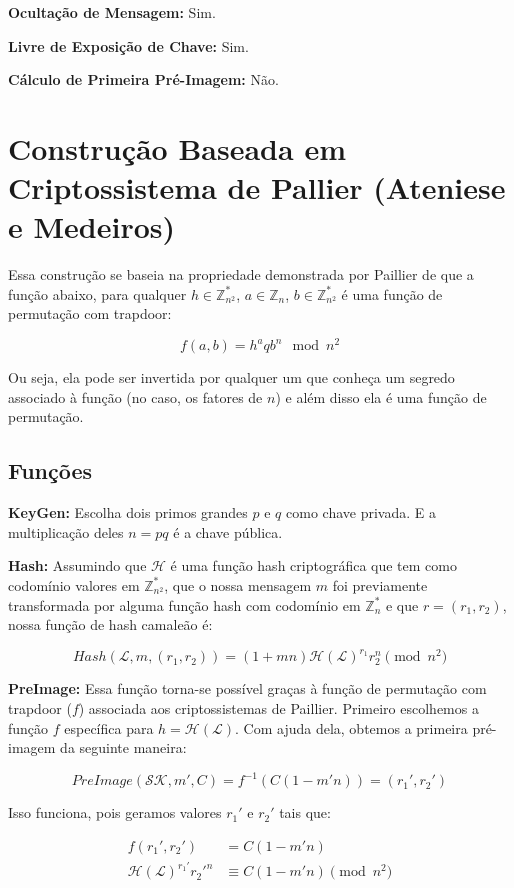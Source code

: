 \documentclass[a4paper]{article}
\begin{document}
\textbf{Ocultação de Mensagem: }Sim.

\textbf{Livre de Exposição de Chave: }Sim.

\textbf{Cálculo de Primeira Pré-Imagem: }Não.

\section{Construção Baseada em Criptossistema de Pallier (Ateniese e Medeiros) \cite{ateniese}}

Essa construção se baseia na propriedade demonstrada por
Paillier\cite{paillier} de que a função abaixo, para qualquer $h \in
\mathbb{Z}^*_{n^2}$, $a\in\mathbb{Z}_n$, $b\in\mathbb{Z}^*_{n^2}$ é
uma função de permutação com trapdoor:

$$
f(a, b) = h^aqb^n \mod n^2
$$

Ou seja, ela pode ser invertida por qualquer um que conheça um segredo
associado à função (no caso, os fatores de $n$) e além disso ela é uma
função de permutação.

\subsection{Funções}

\textbf{KeyGen: } Escolha dois primos grandes $p$ e $q$ como chave
privada. E a multiplicação deles $n=pq$ é a chave pública.

\textbf{Hash: } Assumindo que $\mathcal{H}$ é uma função hash
criptográfica que tem como codomínio valores em $\mathbb{Z}^*_{n^2}$,
que o nossa mensagem $m$ foi previamente transformada por alguma
função hash com codomínio em $\mathbb{Z}^*_{n}$ e que $r = (r_1,
r_2)$, nossa função de hash camaleão é:

$$
Hash(\mathcal{L}, m, (r_1, r_2)) = (1 +mn)\mathcal{H}(\mathcal{L})^{r_1}r_2^n \pmod{n^2}
$$

\textbf{PreImage:} Essa função torna-se possível graças à função
de permutação com trapdoor ($f$) associada aos criptossistemas de
Paillier. Primeiro escolhemos a função $f$ específica para
$h=\mathcal{H}(\mathcal{L})$. Com ajuda dela, obtemos a primeira
pré-imagem da seguinte maneira:

$$
PreImage(\mathcal{SK}, m', C) = f^{-1}(C(1-m'n)) = (r_1', r_2')
$$

Isso funciona, pois geramos valores $r_1'$ e $r_2'$ tais que:

\begin{equation}
\begin{split}
  f(r_1', r_2') &= C(1-m'n)\\
  \mathcal{H}(\mathcal{L})^{r_1'}r_2'^n &\equiv C(1-m'n) \pmod{n^2}\\
\end{split}
\end{equation}
\end{document}
